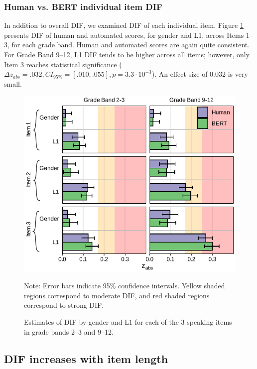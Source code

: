 \documentclass [PhD] {uclathes}
\begin{document}
\subsubsection{Human vs. BERT individual item DIF}

In addition to overall DIF, we examined DIF of each individual item. Figure \ref{fig:zabs_itm} presents DIF of human and automated scores, for gender and L1, across Items 1–3, for each grade band. Human and automated scores are again quite consistent. For Grade Band 9–12, L1 DIF tends to be higher across all items; however, only Item 3 reaches statistical significance ($\Delta z_{abs} = .032, CI_{95\%} = [.010, .055], p = 3.3 \cdot 10^{-3}$). An effect size of 0.032 is very small.

\begin{figure}[h]
    \centering
    \caption{Estimates of DIF by gender and L1 for each of the 3 speaking items in grade bands 2–3 and 9–12.}    
    \includegraphics[width=5in]{figures/20230504_ETS-DIF_BERT_zabs_itm_edit.pdf}
    \label{fig:zabs_itm}
	{\newline Note: Error bars indicate 95\% confidence intervals. Yellow shaded regions correspond to moderate DIF, and red shaded regions correspond to strong DIF. \par}
\end{figure}

\subsection{DIF increases with item length}
\end{document}
